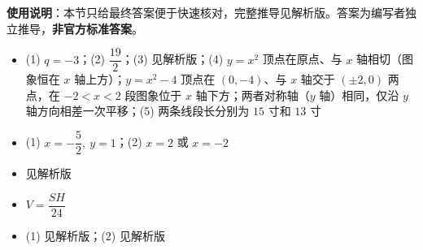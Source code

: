 
\begin{gknotice}
\textbf{使用说明}：本节只给最终答案便于快速核对，完整推导见解析版。答案为编写者独立推导，\textbf{非官方标准答案}。
\end{gknotice}

\begin{itemize}[leftmargin=2.6em]
  \item[\textbf{1.}] (1) $q=-3$；(2) $\dfrac{19}2$；(3) 见解析版；(4) $y=x^2$ 顶点在原点、与 $x$ 轴相切（图象恒在 $x$ 轴上方）；$y=x^2-4$ 顶点在 $(0,-4)$、与 $x$ 轴交于 $(\pm2,0)$ 两点，在 $-2<x<2$ 段图象位于 $x$ 轴下方；两者对称轴（$y$ 轴）相同，仅沿 $y$ 轴方向相差一次平移；(5) 两条线段长分别为 $15$ 寸和 $13$ 寸
  \item[\textbf{2.}] (1) $x=-\dfrac52,\ y=1$；(2) $x=2$ 或 $x=-2$
  \item[\textbf{3.}] 见解析版
  \item[\textbf{4.}] $V=\dfrac{SH}{24}$
  \item[\textbf{5.}] (1) 见解析版；(2) 见解析版
\end{itemize}
